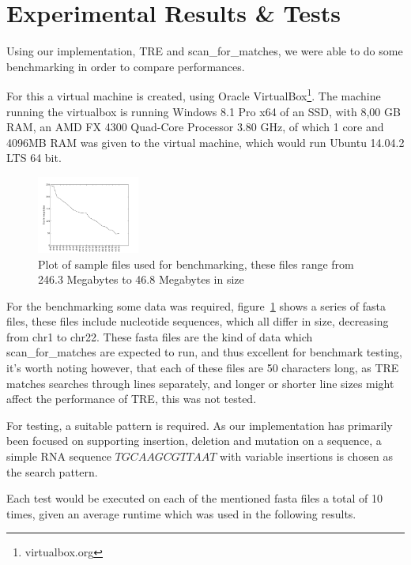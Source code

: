 \section{Experimental Results \& Tests}
Using our implementation, TRE and scan\_for\_matches, we were able to do some benchmarking in order to compare performances.

For this a virtual machine is created, using Oracle VirtualBox\footnote{virtualbox.org}. The machine running the virtualbox is running Windows 8.1 Pro x64 of an SSD, with 8,00 GB RAM, an AMD FX 4300 Quad-Core Processor 3.80 GHz, of which 1 core and 4096MB RAM was given to the virtual machine, which would run Ubuntu 14.04.2 LTS 64 bit.

\begin{figure}
\centering
\includegraphics[width=0.3\textwidth]{Benchmarking/size.png}
\caption{Plot of sample files used for benchmarking, these files range from 246.3 Megabytes to 46.8 Megabytes in size}
\label{fig:size}
\end{figure}

For the benchmarking some data was required, figure~\ref{fig:size} shows a series of fasta files, these files include nucleotide sequences, which all differ in size, decreasing from chr1 to chr22. These fasta files are the  kind of data which scan\_for\_matches are expected to run, and thus excellent for benchmark testing, it's worth noting however, that each of these files are 50 characters long, as TRE matches searches through lines separately, and longer or shorter line sizes might affect the performance of TRE, this was not tested.

For testing, a suitable pattern is required. As our implementation has primarily been focused on supporting insertion, deletion and mutation on a sequence, a simple RNA sequence $TGCAAGCGTTAAT$ with variable insertions is chosen as the search pattern.

Each test would be executed on each of the mentioned fasta files a total of 10 times, given an average runtime which was used in the following results.

